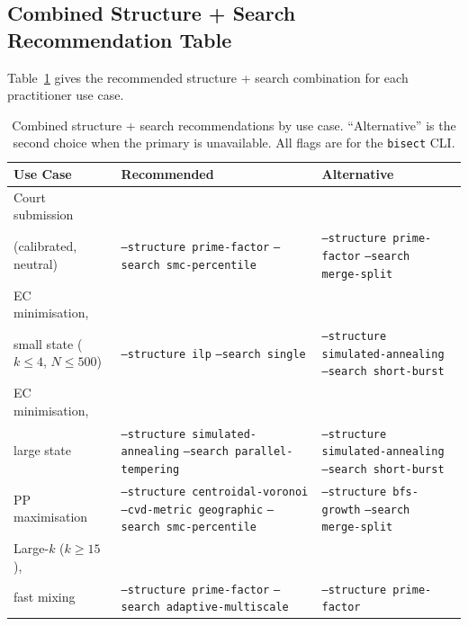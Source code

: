\subsection{Combined Structure + Search Recommendation Table}

Table~\ref{tab:combined} gives the recommended structure + search combination
for each practitioner use case.

\begin{table}[ht]
\centering
\caption{%
  Combined structure + search recommendations by use case.
  ``Alternative'' is the second choice when the primary is unavailable.
  All flags are for the \texttt{bisect} CLI.
}
\label{tab:combined}
\small
\begin{tabular}{@{}p{4.5cm}p{4.2cm}p{4.2cm}@{}}
\toprule
Use Case & Recommended & Alternative \\
\midrule
Court submission\\(calibrated, neutral)
  & \texttt{--structure prime-factor}\newline
    \texttt{--search smc-percentile}
  & \texttt{--structure prime-factor}\newline
    \texttt{--search merge-split} \\[6pt]
EC minimisation,\\small state ($k \leq 4$, $N \leq 500$)
  & \texttt{--structure ilp}\newline
    \texttt{--search single}
  & \texttt{--structure simulated-annealing}\newline
    \texttt{--search short-burst} \\[6pt]
EC minimisation,\\large state
  & \texttt{--structure simulated-annealing}\newline
    \texttt{--search parallel-tempering}
  & \texttt{--structure simulated-annealing}\newline
    \texttt{--search short-burst} \\[6pt]
PP maximisation
  & \texttt{--structure centroidal-voronoi --cvd-metric geographic}\newline
    \texttt{--search smc-percentile}
  & \texttt{--structure bfs-growth}\newline
    \texttt{--search merge-split} \\[6pt]
Large-$k$ ($k \geq 15$),\\fast mixing
  & \texttt{--structure prime-factor}\newline
    \texttt{--search adaptive-multiscale}
  & \texttt{--structure prime-factor}\newline

\end{tabular}
\end{table}
